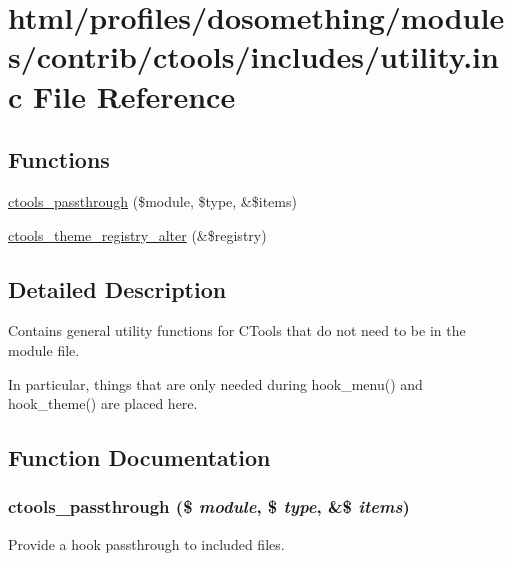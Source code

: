 \hypertarget{utility_8inc}{
\section{html/profiles/dosomething/modules/contrib/ctools/includes/utility.inc File Reference}
\label{utility_8inc}
}
\subsection*{Functions}
\begin{DoxyCompactItemize}
\item 
\hyperlink{utility_8inc_ab8a404ad6d650cd47d70cf2d60f7f004}{ctools\_\-passthrough} (\$module, \$type, \&\$items)
\item 
\hyperlink{utility_8inc_a556bd4f6f591e705590138bc3d756291}{ctools\_\-theme\_\-registry\_\-alter} (\&\$registry)
\end{DoxyCompactItemize}


\subsection{Detailed Description}
Contains general utility functions for CTools that do not need to be in the module file.

In particular, things that are only needed during hook\_\-menu() and hook\_\-theme() are placed here. 

\subsection{Function Documentation}
\hypertarget{utility_8inc_ab8a404ad6d650cd47d70cf2d60f7f004}{
\subsubsection[{ctools\_\-passthrough}]{\setlength{\rightskip}{0pt plus 5cm}ctools\_\-passthrough (\$ {\em module}, \/  \$ {\em type}, \/  \&\$ {\em items})}}
\label{utility_8inc_ab8a404ad6d650cd47d70cf2d60f7f004}
Provide a hook passthrough to included files.

